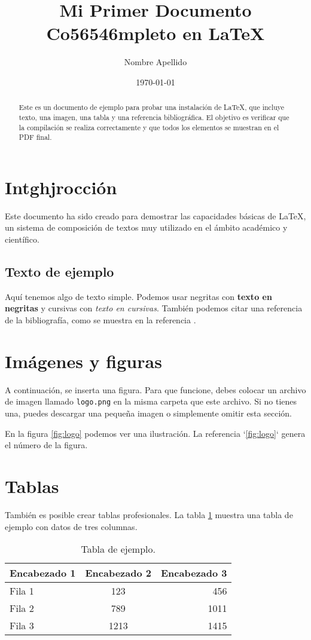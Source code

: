 \documentclass{article}
\title{Mi Primer Documento Co56546mpleto en \LaTeX}
\author{Nombre Apellido}
\date{\today}
\begin{document}
\maketitle

\begin{abstract}
Este es un documento de ejemplo para probar una instalación de \LaTeX, que incluye texto, una imagen, una tabla y una referencia bibliográfica. El objetivo es verificar que la compilación se realiza correctamente y que todos los elementos se muestran en el PDF final.
\end{abstract}

\section{Intghjrocción}
Este documento ha sido creado para demostrar las capacidades básicas de \LaTeX, un sistema de composición de textos muy utilizado en el ámbito académico y científico.

\subsection{Texto de ejemplo}
Aquí tenemos algo de texto simple. Podemos usar negritas con \textbf{texto en negritas} y cursivas con \textit{texto en cursivas}. También podemos citar una referencia de la bibliografía, como se muestra en la referencia \cite{greenwade93}.

\section{Imágenes y figuras}
A continuación, se inserta una figura. Para que funcione, debes colocar un archivo de imagen llamado \texttt{logo.png} en la misma carpeta que este archivo. Si no tienes una, puedes descargar una pequeña imagen o simplemente omitir esta sección.



En la figura \ref{fig:logo} podemos ver una ilustración. La referencia `\ref{fig:logo}` genera el número de la figura.

\section{Tablas}
También es posible crear tablas profesionales. La tabla \ref{tab:ejemplo} muestra una tabla de ejemplo con datos de tres columnas.

\begin{table}[h]
    \centering
    \caption{Tabla de ejemplo.}
    \label{tab:ejemplo}
    \begin{tabular}{lcr}
        \toprule
        Encabezado 1 & Encabezado 2 & Encabezado 3 \\
        \midrule
        Fila 1 & 123 & 456 \\
        Fila 2 & 789 & 1011 \\
        Fila 3 & 1213 & 1415 \\
        \bottomrule
    \end{tabular}
\end{table}
\end{document}
